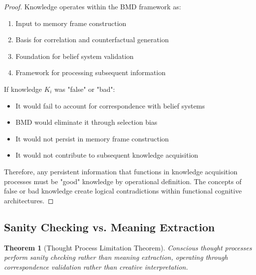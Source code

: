 \documentclass[12pt,a4paper]{article}
\newtheorem{theorem}{Theorem}[section]
\begin{document}
\begin{proof}
Knowledge operates within the BMD framework as:
\begin{enumerate}
\item Input to memory frame construction
\item Basis for correlation and counterfactual generation
\item Foundation for belief system validation
\item Framework for processing subsequent information
\end{enumerate}

If knowledge $K_i$ was "false" or "bad":
\begin{itemize}
\item It would fail to account for correspondence with belief systems
\item BMD would eliminate it through selection bias
\item It would not persist in memory frame construction
\item It would not contribute to subsequent knowledge acquisition
\end{itemize}

Therefore, any persistent information that functions in knowledge acquisition processes must be "good" knowledge by operational definition. The concepts of false or bad knowledge create logical contradictions within functional cognitive architectures.
\end{proof}

\subsection{Sanity Checking vs. Meaning Extraction}

\begin{theorem}[Thought Process Limitation Theorem]
Conscious thought processes perform sanity checking rather than meaning extraction, operating through correspondence validation rather than creative interpretation.
\end{theorem}
\end{document}
